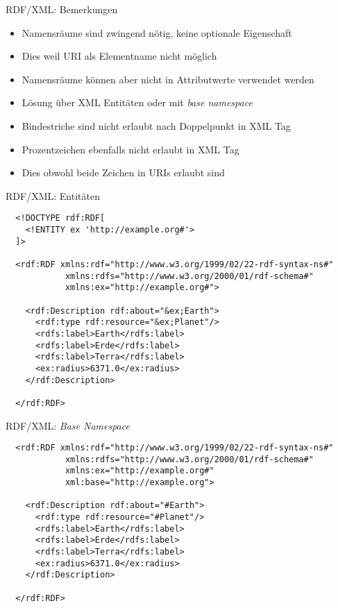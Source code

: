 \documentclass{beamer}
\begin{document}
\begin{frame}{RDF/XML: Bemerkungen}
	
	\begin{itemize}
		\item Namensräume sind zwingend nötig, keine optionale Eigenschaft
		\item Dies weil URI als Elementname nicht möglich
		\item Namensräume können aber nicht in Attributwerte verwendet werden
		\item Lösung über XML Entitäten oder mit \emph{base namespace}
		\item Bindestriche sind nicht erlaubt nach Doppelpunkt in XML Tag
		\item Prozentzeichen ebenfalls nicht erlaubt in XML Tag
		\item Dies obwohl beide Zeichen in URIs erlaubt sind
	\end{itemize}
	
\end{frame}

\begin{frame}[fragile]{RDF/XML: Entitäten}
	
	\small
	\begin{lstlisting}
  <!DOCTYPE rdf:RDF[
    <!ENTITY ex 'http://example.org#'>
  ]>
  
  <rdf:RDF xmlns:rdf="http://www.w3.org/1999/02/22-rdf-syntax-ns#"
            xmlns:rdfs="http://www.w3.org/2000/01/rdf-schema#"
            xmlns:ex="http://example.org#">
	
    <rdf:Description rdf:about="&ex;Earth">
      <rdf:type rdf:resource="&ex;Planet"/>
      <rdfs:label>Earth</rdfs:label>
      <rdfs:label>Erde</rdfs:label>
      <rdfs:label>Terra</rdfs:label>
      <ex:radius>6371.0</ex:radius>
    </rdf:Description>
	
  </rdf:RDF>		
	\end{lstlisting}
	
\end{frame}

\begin{frame}[fragile]{RDF/XML: \emph{Base Namespace}}
	
	\small
	\begin{lstlisting}
  <rdf:RDF xmlns:rdf="http://www.w3.org/1999/02/22-rdf-syntax-ns#"
            xmlns:rdfs="http://www.w3.org/2000/01/rdf-schema#"
            xmlns:ex="http://example.org#"
            xml:base="http://example.org">
	
    <rdf:Description rdf:about="#Earth">
      <rdf:type rdf:resource="#Planet"/>
      <rdfs:label>Earth</rdfs:label>
      <rdfs:label>Erde</rdfs:label>
      <rdfs:label>Terra</rdfs:label>
      <ex:radius>6371.0</ex:radius>
    </rdf:Description>
	
  </rdf:RDF>		
	\end{lstlisting}
	
\end{frame}
\end{document}
